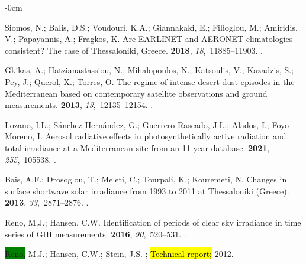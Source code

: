 \documentclass[applsci,article,accept,moreauthors,pdftex]{Definitions/mdpi}
\begin{document}
\begin{adjustwidth}{-\extralength}{0cm}
\begin{thebibliography}{999}
Siomos, N.; Balis, D.S.; Voudouri, K.A.; Giannakaki, E.; Filioglou, M.;
  Amiridis, V.; Papayannis, A.; Fragkos, K.
\newblock Are {EARLINET} and {AERONET} climatologies consistent? The case of
  Thessaloniki, Greece.
 {\bf 2018}, {\em
  18},~11885--11903.
.

Gkikas, A.; Hatzianastassiou, N.; Mihalopoulos, N.; Katsoulis, V.; Kazadzis,
  S.; Pey, J.; Querol, X.; Torres, O.
\newblock The regime of intense desert dust episodes in the Mediterranean based
  on contemporary satellite observations and ground measurements.
 {\bf 2013}, {\em
  13},~12135--12154.
.

Lozano, I.L.; Sánchez-Hernández, G.; Guerrero-Rascado, J.L.; Alados, I.;
  Foyo-Moreno, I.
\newblock Aerosol radiative effects in photosynthetically active radiation and
  total irradiance at a Mediterranean site from an 11-year database.
 {\bf 2021}, {\em 255},~105538.
.

Bais, A.F.; Drosoglou, T.; Meleti, C.; Tourpali, K.; Kouremeti, N.
\newblock Changes in surface shortwave solar irradiance from 1993 to 2011 at
  Thessaloniki (Greece).
 {\bf 2013}, {\em
  33},~2871--2876.
.

Reno, M.J.; Hansen, C.W.
\newblock Identification of periods of clear sky irradiance in time series of
  GHI measurements.
 {\bf 2016}, {\em 90},~520--531.
.

\colorbox{green}{Reno,} %
 M.J.; Hansen, C.W.; Stein, J.S.
;
\newblock \hl{Technical report;}  %
 2012.


\end{thebibliography}
\end{adjustwidth}
\end{document}

